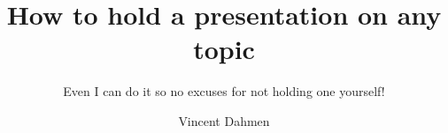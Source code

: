 \title{How to hold a presentation on any topic}
\subtitle{Even I can do it so no excuses for not holding one yourself!}
\author{Vincent Dahmen}
